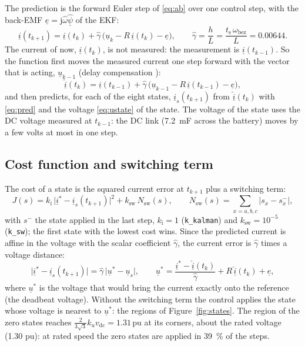 \documentclass[11pt,a4paper]{scrartcl}
\newcommand{\ped}[1]{_{\mathrm{#1}}}
\newcommand{\code}[1]{\texttt{#1}}
\newcommand{\pun}{\,\mathrm{pu}}
\newcommand{\jj}{\mathrm{j}}
\begin{document}
\begin{onehalfspace}
The prediction is the forward Euler step of \eqref{eq:ab} over one control step, with the back-EMF $\underline{e} = \jj\hat\omega\hat{\underline{\psi}}$ of the EKF:
\begin{equation}
	\underline{i}(t_{k+1}) = \underline{i}(t_k) + \hat\gamma\,\big(\underline{u}_k - R\,\underline{i}(t_k) - \underline{e}\big), \qquad \hat\gamma = \frac{h}{L} = \frac{t\ped{s}\,\omega\ped{bez}}{L} = 0.00644 .
	\label{eq:pred}
\end{equation}
The current of now, $\underline{i}(t_k)$, is not measured: the measurement is $\underline{i}(t_{k-1})$. So the function first moves the measured current one step forward with the vector that is acting, $\underline{u}_{k-1}$ (delay compensation \cite{cortes2012}):
\begin{equation}
	\hat{\underline{i}}(t_k) = \underline{i}(t_{k-1}) + \hat\gamma\,\big(\underline{u}_{k-1} - R\,\underline{i}(t_{k-1}) - \underline{e}\big),
	\label{eq:comp}
\end{equation}
and then predicts, for each of the eight states, $\underline{i}_s(t_{k+1})$ from $\hat{\underline{i}}(t_k)$ with \eqref{eq:pred} and the voltage \eqref{eq:ustate} of the state. The voltage of the state uses the DC voltage measured at $t_{k-1}$: the DC link (\SI{7.2}{\milli\farad} across the battery) moves by a few volts at most in one step.

\subsection{Cost function and switching term}
\label{sec:cost}

The cost of a state is the squared current error at $t_{k+1}$ plus a switching term:
\begin{equation}
	J(s) = k\ped{i}\,\big|\underline{i}^* - \underline{i}_s(t_{k+1})\big|^2 + k\ped{sw}\,N\ped{sw}(s), \qquad
	N\ped{sw}(s) = \sum_{x=a,b,c} |s_x - s_x^-|,
	\label{eq:cost}
\end{equation}
with $s^-$ the state applied in the last step, $k\ped{i} = 1$ (\code{k\_kalman}) and $k\ped{sw} = 10^{-5}$ (\code{k\_sw}); the first state with the lowest cost wins. Since the predicted current is affine in the voltage with the scalar coefficient $\hat\gamma$, the current error is $\hat\gamma$ times a voltage distance:
\begin{equation}
	\big|\underline{i}^* - \underline{i}_s(t_{k+1})\big| = \hat\gamma\,\big|\underline{u}^* - \underline{u}_s\big|, \qquad
	\underline{u}^* = \frac{\underline{i}^* - \hat{\underline{i}}(t_k)}{\hat\gamma} + R\,\hat{\underline{i}}(t_k) + \underline{e},
	\label{eq:nearest}
\end{equation}
where $\underline{u}^*$ is the voltage that would bring the current exactly onto the reference (the deadbeat voltage). Without the switching term the control applies the state whose voltage is nearest to $\underline{u}^*$: the regions of Figure~\ref{fig:states}. The region of the zero states reaches $\frac{2}{3\sqrt3}k_u v\ped{dc} = 1.31\pun$ at its corners, about the rated voltage (\SI{1.30}{} pu): at rated speed the zero states are applied in \SI{39}{\percent} of the steps.


\end{onehalfspace}
\end{document}
